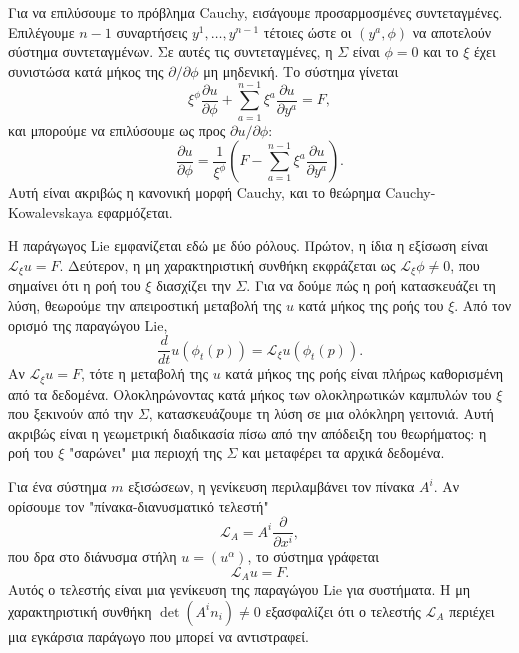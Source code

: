 \documentclass[12pt]{article}
\begin{document}
Για να επιλύσουμε το πρόβλημα Cauchy, εισάγουμε προσαρμοσμένες συντεταγμένες. Επιλέγουμε $n-1$ συναρτήσεις $y^1, \dots, y^{n-1}$ τέτοιες ώστε οι $(y^a, \phi)$ να αποτελούν σύστημα συντεταγμένων. Σε αυτές τις συντεταγμένες, η $\Sigma$ είναι $\phi = 0$ και το $\xi$ έχει συνιστώσα κατά μήκος της $\partial / \partial \phi$ μη μηδενική. Το σύστημα γίνεται
\begin{equation}
\xi^\phi \frac{\partial u}{\partial \phi} + \sum_{a=1}^{n-1} \xi^a \frac{\partial u}{\partial y^a} = F,
\end{equation}
και μπορούμε να επιλύσουμε ως προς $\partial u / \partial \phi$:
\begin{equation}
\frac{\partial u}{\partial \phi} = \frac{1}{\xi^\phi} \left( F - \sum_{a=1}^{n-1} \xi^a \frac{\partial u}{\partial y^a} \right).
\end{equation}
Αυτή είναι ακριβώς η κανονική μορφή Cauchy, και το θεώρημα Cauchy-Kowalevskaya εφαρμόζεται.

Η παράγωγος Lie εμφανίζεται εδώ με δύο ρόλους. Πρώτον, η ίδια η εξίσωση είναι $\mathcal{L}_\xi u = F$. Δεύτερον, η μη χαρακτηριστική συνθήκη εκφράζεται ως $\mathcal{L}_\xi \phi \neq 0$, που σημαίνει ότι η ροή του $\xi$ διασχίζει την $\Sigma$. Για να δούμε πώς η ροή κατασκευάζει τη λύση, θεωρούμε την απειροστική μεταβολή της $u$ κατά μήκος της ροής του $\xi$. Από τον ορισμό της παραγώγου Lie,
\begin{equation}
\frac{d}{dt} u(\phi_t(p)) = \mathcal{L}_\xi u (\phi_t(p)).
\end{equation}
Αν $\mathcal{L}_\xi u = F$, τότε η μεταβολή της $u$ κατά μήκος της ροής είναι πλήρως καθορισμένη από τα δεδομένα. Ολοκληρώνοντας κατά μήκος των ολοκληρωτικών καμπυλών του $\xi$ που ξεκινούν από την $\Sigma$, κατασκευάζουμε τη λύση σε μια ολόκληρη γειτονιά. Αυτή ακριβώς είναι η γεωμετρική διαδικασία πίσω από την απόδειξη του θεωρήματος: η ροή του $\xi$ "σαρώνει" μια περιοχή της $\Sigma$ και μεταφέρει τα αρχικά δεδομένα.

Για ένα σύστημα $m$ εξισώσεων, η γενίκευση περιλαμβάνει τον πίνακα $A^i$. Αν ορίσουμε τον "πίνακα-διανυσματικό τελεστή"
\begin{equation}
\mathcal{L}_A = A^i \frac{\partial}{\partial x^i},
\end{equation}
που δρα στο διάνυσμα στήλη $u = (u^\alpha)$, το σύστημα γράφεται
\begin{equation}
\mathcal{L}_A u = F.
\end{equation}
Αυτός ο τελεστής είναι μια γενίκευση της παραγώγου Lie για συστήματα. Η μη χαρακτηριστική συνθήκη $\det(A^i n_i) \neq 0$ εξασφαλίζει ότι ο τελεστής $\mathcal{L}_A$ περιέχει μια εγκάρσια παράγωγο που μπορεί να αντιστραφεί.
\end{document}
